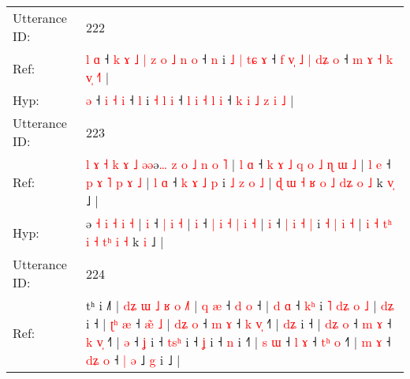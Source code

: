 \documentclass[10pt]{article}
\DeclareRobustCommand{\hl}[1]{{\textcolor{red}{#1}}}
\begin{document}
\begin{longtable}{ll}
 \\
\midrule
Utterance ID: & 222 \\
Ref: & \hl{l}\hl{ }\hl{ɑ} ˧\hl{ }\hl{k}\hl{ }\hl{ɤ}\hl{ }\hl{˩}\hl{ }\hl{|}\hl{ }\hl{z}\hl{ }\hl{o} \hl{˩} \hl{n} \hl{o} ˧ \hl{n} i\hl{ }\hl{˩} \hl{|} \hl{t}\hl{ɕ} \hl{ɤ} ˧\hl{ }\hl{f} \hl{v}\hl{̩} \hl{˩} \hl{|} \hl{d}\hl{ʑ} \hl{o} ˧ \hl{m} \hl{ɤ} \hl{˧} \hl{k} \hl{v}\hl{̩} \hl{˧}\hl{˥} |
 \\
Hyp: & \hl{}\hl{}\hl{ə} ˧\hl{}\hl{}\hl{}\hl{}\hl{}\hl{}\hl{}\hl{}\hl{}\hl{}\hl{}\hl{} \hl{i} \hl{˧} \hl{i} ˧ \hl{l} i\hl{}\hl{} \hl{˧} \hl{}\hl{l} \hl{i} ˧\hl{}\hl{} \hl{}\hl{l} \hl{i} \hl{˧} \hl{}\hl{l} \hl{i} ˧ \hl{k} \hl{i} \hl{˩} \hl{z} \hl{}\hl{i} \hl{}\hl{˩} |
 \\
\midrule
Utterance ID: & 223 \\
Ref: & \hl{l}\hl{ }\hl{ɤ}\hl{ }\hl{˧}\hl{ }\hl{k}\hl{ }\hl{ɤ}\hl{ }\hl{˩}\hl{ }\hl{ə}\hl{ə}ə\hl{…}\hl{ }\hl{z} \hl{o} \hl{˩} \hl{n} \hl{o} \hl{˥} |\hl{ }\hl{l} \hl{ɑ} ˧\hl{ }\hl{k}\hl{ }\hl{ɤ}\hl{ }\hl{˩}\hl{ }\hl{q}\hl{ }\hl{o}\hl{ }\hl{˩} \hl{ɳ} \hl{ɯ} \hl{˩} |\hl{ }\hl{l} \hl{e} ˧ \hl{p} \hl{ɤ} \hl{˥} \hl{p} \hl{ɤ} \hl{˩} |\hl{ }\hl{l} \hl{ɑ} ˧ \hl{k} \hl{ɤ} \hl{˩} \hl{p} i \hl{˩} \hl{z} \hl{o} \hl{˩} | \hl{ɖ} \hl{ɯ} \hl{˧}\hl{ }\hl{ʁ} \hl{o} \hl{˩} \hl{d}\hl{ʑ} \hl{o} \hl{˩} k \hl{v}\hl{̩} ˩ |
 \\
Hyp: & \hl{}\hl{}\hl{}\hl{}\hl{}\hl{}\hl{}\hl{}\hl{}\hl{}\hl{}\hl{}\hl{}\hl{}ə\hl{}\hl{}\hl{} \hl{˧} \hl{i} \hl{˧} \hl{i} \hl{˧} |\hl{}\hl{} \hl{i} ˧\hl{}\hl{}\hl{}\hl{}\hl{}\hl{}\hl{}\hl{}\hl{}\hl{}\hl{}\hl{} \hl{|} \hl{i} \hl{˧} |\hl{}\hl{} \hl{i} ˧ \hl{|} \hl{i} \hl{˧} \hl{|} \hl{i} \hl{˧} |\hl{}\hl{} \hl{i} ˧ \hl{|} \hl{i} \hl{˧} \hl{|} i \hl{˧} \hl{|} \hl{i} \hl{˧} | \hl{i} \hl{˧} \hl{}\hl{t}\hl{ʰ} \hl{i} \hl{˧} \hl{t}\hl{ʰ} \hl{i} \hl{˧} k \hl{}\hl{i} ˩ |
 \\
\midrule
Utterance ID: & 224 \\
Ref: & tʰ i ˩˥ |\hl{ }\hl{d}\hl{ʑ} \hl{ɯ} \hl{˩} \hl{ʁ} \hl{o} \hl{˩}\hl{˥} |\hl{ }\hl{q} \hl{æ} ˧ \hl{d} \hl{o} ˧ |\hl{ }\hl{d} \hl{ɑ} ˧ \hl{k}\hl{ʰ} i \hl{˥} \hl{d}\hl{ʑ} \hl{o} \hl{˩} |\hl{ }\hl{d}\hl{ʑ} i ˧ |\hl{ }\hl{ʈ}\hl{ʰ} \hl{æ} ˧\hl{ }\hl{æ}\hl{̃}\hl{ }\hl{˩} |\hl{ }\hl{d}\hl{ʑ} \hl{o} ˧ \hl{m} \hl{ɤ} ˧ \hl{k} \hl{v}\hl{̩} ˧\hl{˥} |\hl{ }\hl{d}\hl{ʑ} i ˧ |\hl{ }\hl{d}\hl{ʑ} \hl{o} ˧ \hl{m} \hl{ɤ} ˧ \hl{k} \hl{v}\hl{̩} ˧\hl{˥} | \hl{ə} ˧ \hl{ʝ} i ˧ \hl{t}\hl{s}\hl{ʰ} i ˧ \hl{ʝ} i ˧ \hl{n} i ˧\hl{˥} |\hl{ }\hl{s} \hl{ɯ} ˧ \hl{l} \hl{ɤ} ˧ \hl{t}\hl{ʰ} \hl{o} ˧\hl{˥} |\hl{ }\hl{m} \hl{ɤ} ˧ \hl{d}\hl{ʑ} \hl{o} ˧ \hl{|} \hl{ə} ˩ \hl{g} i ˩ |

\end{longtable}
\end{document}
